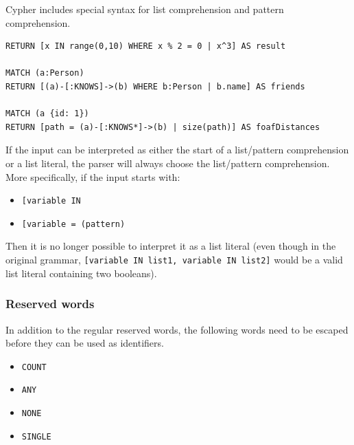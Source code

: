 Cypher includes special syntax for list comprehension and pattern comprehension.

\begin{verbatim}
RETURN [x IN range(0,10) WHERE x % 2 = 0 | x^3] AS result

MATCH (a:Person)
RETURN [(a)-[:KNOWS]->(b) WHERE b:Person | b.name] AS friends

MATCH (a {id: 1})
RETURN [path = (a)-[:KNOWS*]->(b) | size(path)] AS foafDistances
\end{verbatim}

If the input can be interpreted as either the start of a list/pattern comprehension or a list literal, the parser will always choose the list/pattern comprehension. More specifically, if the input starts with:

\begin{itemize}
    \item \texttt{[variable IN}
    \item \texttt{[variable = (pattern)}
\end{itemize}

Then it is no longer possible to interpret it as a list literal (even though in the original grammar, \texttt{[variable IN list1, variable IN list2]} would be a valid list literal containing two booleans).

\subsubsection*{Reserved words}

In addition to the regular reserved words, the following words need to be escaped before they can be used as identifiers.

\begin{itemize}
    \item \texttt{COUNT}
    \item \texttt{ANY}
    \item \texttt{NONE}
    \item \texttt{SINGLE}
\end{itemize}